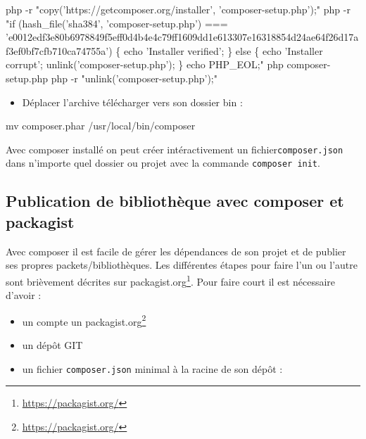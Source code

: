\documentclass[11pt,a4paper,krantz2,11pt,oneside]{krantz}
\newenvironment{Shaded}{\begin{snugshade}}{\end{snugshade}}
\newcommand{\ExtensionTok}[1]{#1}
\newcommand{\FunctionTok}[1]{\textcolor[rgb]{0,0,0}{#1}}
\newcommand{\NormalTok}[1]{#1}
\newcommand{\StringTok}[1]{\textcolor[rgb]{0.5,0.5,0.5}{#1}}
\providecommand{\tightlist}{%
  \setlength{\itemsep}{0pt}\setlength{\parskip}{0pt}}
\renewcommand{\href}[2]{#2\footnote{\url{#1}}}
\begin{document}
\begin{Shaded}
\begin{Highlighting}[]
\ExtensionTok{php}\NormalTok{ -r }\StringTok{"copy('https://getcomposer.org/installer', 'composer-setup.php');"}
\ExtensionTok{php}\NormalTok{ -r }\StringTok{"if (hash_file('sha384', 'composer-setup.php') === 'e0012edf3e80b6978849f5eff0d4b4e4c79ff1609dd1e613307e16318854d24ae64f26d17af3ef0bf7cfb710ca74755a') \{ echo 'Installer verified'; \} else \{ echo 'Installer corrupt'; unlink('composer-setup.php'); \} echo PHP_EOL;"}
\ExtensionTok{php}\NormalTok{ composer-setup.php}
\ExtensionTok{php}\NormalTok{ -r }\StringTok{"unlink('composer-setup.php');"}
\end{Highlighting}
\end{Shaded}

\begin{itemize}
\tightlist
\item
  Déplacer l'archive télécharger vers son dossier bin :
\end{itemize}

\begin{Shaded}
\begin{Highlighting}[]
\FunctionTok{mv}\NormalTok{ composer.phar /usr/local/bin/composer}
\end{Highlighting}
\end{Shaded}

Avec composer installé on peut créer intéractivement un fichier\texttt{composer.json} dans n'importe quel dossier ou projet avec la commande \texttt{composer\ init}.

\hypertarget{publication-de-bibliothuxe8que-avec-composer-et-packagist}{%
\subsection{Publication de bibliothèque avec composer et packagist}\label{publication-de-bibliothuxe8que-avec-composer-et-packagist}}

Avec composer il est facile de gérer les dépendances de son projet et de publier ses propres packets/bibliothèques. Les différentes étapes pour faire l'un ou l'autre sont brièvement décrites sur \href{https://packagist.org/}{packagist.org}. Pour faire court il est nécessaire d'avoir :

\begin{itemize}
\tightlist
\item
  un compte un \href{https://packagist.org/}{packagist.org}
\item
  un dépôt GIT
\item
  un fichier \texttt{composer.json} minimal à la racine de son dépôt :
\end{itemize}
\end{document}
